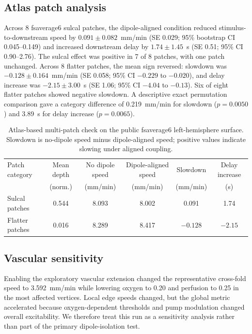 \documentclass[12pt]{article}
\begin{document}
\FloatBarrier
\subsection{Atlas patch analysis}

Across 8 fsaverage6 sulcal patches, the dipole-aligned condition reduced stimulus-to-downstream speed by $0.091\pm0.082$~mm/min (SE 0.029; 95\% bootstrap CI 0.045--0.149) and increased downstream delay by $1.74\pm1.45$~s (SE 0.51; 95\% CI 0.90--2.76). The sulcal effect was positive in 7 of 8 patches, with one patch unchanged. Across 8 flatter patches, the mean sign reversed: slowdown was $-0.128\pm0.164$~mm/min (SE 0.058; 95\% CI $-0.229$ to $-0.020$), and delay increase was $-2.15\pm3.00$~s (SE 1.06; 95\% CI $-4.04$ to $-0.13$). Six of eight flatter patches showed negative slowdown. A descriptive exact permutation comparison gave a category difference of 0.219~mm/min for slowdown ($p=0.0050$) and 3.89~s for delay increase ($p=0.0065$).

\begin{table}[t]
\centering
\small
\caption{Atlas-based multi-patch check on the public fsaverage6 left-hemisphere surface. Slowdown is no-dipole speed minus dipole-aligned speed; positive values indicate slowing under aligned coupling.}
\label{tab:atlas}
\begin{tabular}{@{}lccccc@{}}
\toprule
Patch category & Mean depth & No dipole speed & Dipole-aligned speed & Slowdown & Delay increase \\
 & (norm.) & (mm/min) & (mm/min) & (mm/min) & (s) \\
\midrule
Sulcal patches & 0.544 & 8.093 & 8.002 & 0.091 & 1.74 \\
Flatter patches & 0.016 & 8.289 & 8.417 & $-0.128$ & $-2.15$ \\
\bottomrule
\end{tabular}
\end{table}

\FloatBarrier
\subsection{Vascular sensitivity}

Enabling the exploratory vascular extension changed the representative cross-fold speed to 3.592~mm/min while lowering oxygen to 0.20 and perfusion to 0.25 in the most affected vertices. Local edge speeds changed, but the global metric accelerated because oxygen-dependent thresholds and pump modulation changed overall excitability. We therefore treat this run as a sensitivity analysis rather than part of the primary dipole-isolation test.
\end{document}
